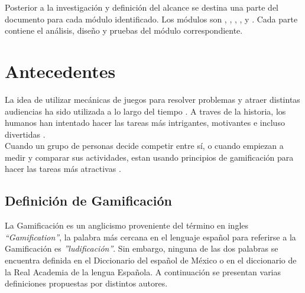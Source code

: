 \noindent Posterior a la investigación y definición del alcance se destina una parte del documento para cada módulo identificado. Los módulos son , , , ,  y . Cada parte contiene el análisis, diseño y pruebas del módulo correspondiente.
\clearpage


\section{Antecedentes}
\label{sec:antecedentes}

La idea de utilizar mecánicas de juegos para resolver problemas y atraer distintas audiencias ha sido utilizada a lo largo del tiempo \cite{GamByDesign}. A traves de la historia, los humanos han intentado hacer las tareas más intrigantes, motivantes e incluso divertidas \cite{Octalysis}.\\

\noindent Cuando un grupo de personas decide competir entre sí, o cuando empiezan a medir y comparar sus actividades, estan usando principios de gamificación para hacer las tareas más atractivas \cite[p. 7]{Octalysis}.


\subsection{Definición de Gamificación}

La Gamificación es un anglicismo proveniente del término en ingles {\it ``Gamification''}, la palabra más cercana en el lenguaje español para referirse a la Gamificación es {\it ''ludificación''}. Sin embargo, ninguna de las dos palabras se encuentra definida en el Diccionario del español de México o en el diccionario de la Real Academia de la lengua Española. A continuación se presentan varias definiciones propuestas por distintos autores.

